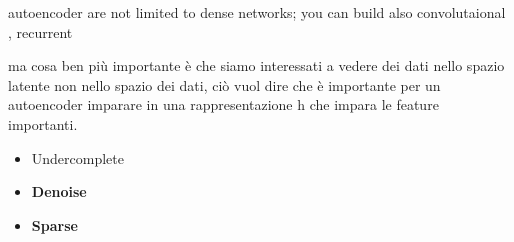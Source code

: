 autoencoder are not limited to dense networks; you can build also
convolutaional , recurrent

ma cosa ben più importante è che siamo interessati a vedere dei dati nello
spazio latente non nello spazio dei dati, ciò vuol dire che è importante per
un autoencoder imparare in una rappresentazione h che impara le feature
importanti.

\begin{itemize}
    \item {Undercomplete}
    \item \textbf{Denoise}
    \item \textbf{Sparse}
\end{itemize}
